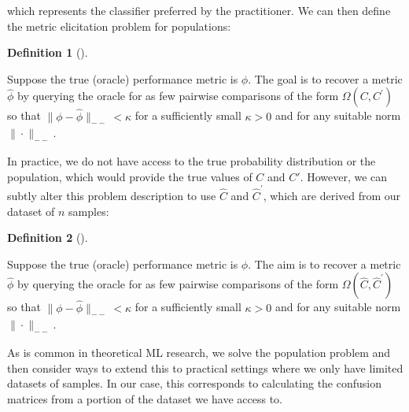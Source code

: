\documentclass[
  letterpaper,
  numbers=noenddot,
  DIV=11]{scrreprt}
\theoremstyle{plain}
\theoremstyle{definition}
\newtheorem{definition}{Definition}[chapter]
\theoremstyle{plain}
\theoremstyle{remark}
\begin{document}
which represents the classifier preferred by the practitioner. We can
then define the metric elicitation problem for populations:

\begin{tcolorbox}[colframe=.grey, title=\faPenSquare \enspace Definition]

\begin{definition}[]\protect\hypertarget{def-def3.1}{}\label{def-def3.1}

Suppose the true (oracle) performance metric is \(\phi\). The goal is to
recover a metric \(\hat{\phi}\) by querying the oracle for as few
pairwise comparisons of the form \(\Omega\left(C, C^{\prime}\right)\) so
that \(\|\phi - \hat{\phi}\|_{--} < \kappa\) for a sufficiently small
\(\kappa > 0\) and for any suitable norm \(\|\cdot\|_{--}\).

\end{definition}

\end{tcolorbox}

In practice, we do not have access to the true probability distribution
or the population, which would provide the true values of \(C\) and
\(C'\). However, we can subtly alter this problem description to use
\(\hat{C}\) and \(\hat{C}^{\prime}\), which are derived from our dataset
of \(n\) samples:

\begin{tcolorbox}[colframe=.grey, title=\faPenSquare \enspace Definition]

\begin{definition}[]\protect\hypertarget{def-def3.2}{}\label{def-def3.2}

Suppose the true (oracle) performance metric is \(\phi\). The aim is to
recover a metric \(\hat{\phi}\) by querying the oracle for as few
pairwise comparisons of the form
\(\Omega\left(\hat{C}, \hat{C}^{\prime}\right)\) so that
\(\|\phi - \hat{\phi}\|_{--} < \kappa\) for a sufficiently small
\(\kappa > 0\) and for any suitable norm \(\|\cdot\|_{--}\).

\end{definition}

\end{tcolorbox}

As is common in theoretical ML research, we solve the population problem
and then consider ways to extend this to practical settings where we
only have limited datasets of samples. In our case, this corresponds to
calculating the confusion matrices from a portion of the dataset we have
access to.
\end{document}
